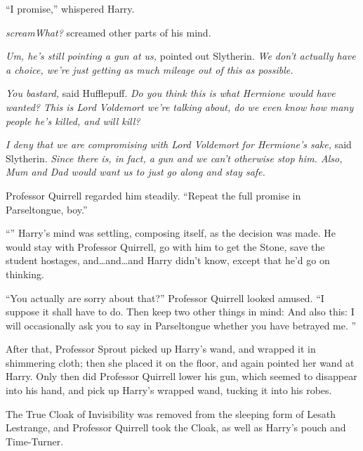 “I promise,” whispered Harry.

\emph{scream{What?}} screamed other parts of his mind.

\emph{Um, he’s still pointing a gun at us,} pointed out Slytherin. \emph{We don’t actually have a choice, we’re just getting as much mileage out of this as possible.}

\emph{You bastard,} said Hufflepuff. \emph{Do you think this is what Hermione would have wanted? This is Lord Voldemort we’re talking about, do we even know how many people he’s killed, and will kill?}

\emph{I deny that we are compromising with Lord Voldemort for Hermione’s sake,} said Slytherin. \emph{Since there is, in fact, a gun and we can’t otherwise stop him. Also, Mum and Dad would want us to just go along and stay safe.}

Professor Quirrell regarded him steadily. “Repeat the full promise in Parseltongue, boy.”

“” Harry’s mind was settling, composing itself, as the decision was made. He would stay with Professor Quirrell, go with him to get the Stone, save the student hostages, and…and…and Harry didn’t know, except that he’d go on thinking.

“You actually are sorry about that?” Professor Quirrell looked amused. “I suppose it shall have to do. Then keep two other things in mind:  And also this: I will occasionally ask you to say in Parseltongue whether you have betrayed me. ”

\later

After that, Professor Sprout picked up Harry’s wand, and wrapped it in shimmering cloth; then she placed it on the floor, and again pointed her wand at Harry. Only then did Professor Quirrell lower his gun, which seemed to disappear into his hand, and pick up Harry’s wrapped wand, tucking it into his robes.

The True Cloak of Invisibility was removed from the sleeping form of Lesath Lestrange, and Professor Quirrell took the Cloak, as well as Harry’s pouch and Time-Turner.

